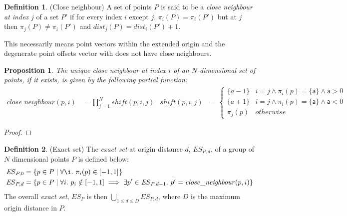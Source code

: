 \documentclass[acmlarge,review]{acmart}
\theoremstyle{definition}
\newtheorem{defn}{Definition}
\theoremstyle{plain}
\newtheorem{prop}{Proposition}
\theoremstyle{remark}
\begin{document}
\begin{defn}{(Close neighbour)}
 A set of points $P$ is said to be a \emph{close neighbour at index $j$} of a set
   $P'$ if for every index $i$ except $j$, $\pi_i(P) = \pi_i(P')$ 
 but at $j$ then $\pi_j(P) \neq \pi_i(P')$ and
 $\textit{dist}_j(P) = \textit{dist}_i(P') + 1$. 

  This necessarily means point vectors within the extended origin and the
  degenerate point offsets vector with \interv{-\infty}{\infty}{} does not have
  close neighbours.
\end{defn}
%
\begin{prop}
  The unique close neighbour at index $i$ of an $N$-dimensional set of
  points, if it exists, is given by the following partial function:
%
  \begin{align*}
    \mathit{close\_neighbour}(p,i) & = \prod^{N}_{j=1} \mathit{shift}(p,i,j) &
%
    \mathit{shift}(p,i,j) & =
      \begin{cases}
        \{a - 1\} & i = j \wedge \pi_i(p) = \{\mathsf{a}\} \wedge \mathsf{a} > 0\\
        \{a + 1\} & i = j \wedge \pi_i(p) = \{\mathsf{a}\} \wedge \mathsf{a} < 0\\
        \pi_j(p)  & otherwise
      \end{cases}
  \end{align*}
\end{prop}
%
\begin{proof}
\end{proof}

\begin{defn}{(Exact set)}
  The \emph{exact set} at origin distance $d$, $\mathit{ES}_{P,d}$, of a group
  of $N$ dimensional points $P$ is defined below:
%
  \begin{align*}
    \mathit{ES}_{P,0} & = \{ p \in P \mid \forall \i.\ \pi_i(p) \in \interv{-1}{1}{} \} \\
    \mathit{ES}_{P,d} & =
      \{ p \in P \mid \forall i.\
      p_i \notin [-1,1] \implies
         \exists p' \in \mathit{ES}_{P,d-1}.\ p' =
         \mathit{close\_neighbour}(p,i) \}
  \end{align*}
%
  The overall \emph{exact set}, $\mathit{ES}_P$ is then
  $\bigcup_{1 \leq d \leq D} \mathit{ES}_{P,d}$, where $D$ is the maximum origin
  distance in $P$.
\end{defn}
\end{document}

